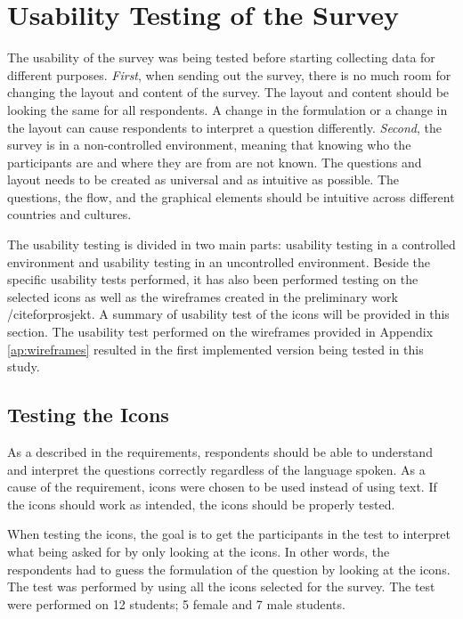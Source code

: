 \section{Usability Testing of the Survey}\label{sec:usabilitytestingsurvey}

  The usability of the survey was being tested before starting collecting data for different purposes. {\it First}, when sending out the survey, there is no much room for changing the layout and content of the survey. The layout and content should be looking the same for all respondents. A change in the formulation or a change in the layout can cause respondents to interpret a question differently. {\it Second}, the survey is in a non-controlled environment, meaning that knowing who the participants are and where they are from are not known. The questions and layout needs to be created as universal and as intuitive as possible. The questions, the flow, and the graphical elements should be intuitive across different countries and cultures. 

  The usability testing is divided in two main parts: usability testing in a controlled environment and usability testing in an uncontrolled environment. Beside the specific usability tests performed, it has also been performed testing on the selected icons as well as the wireframes created in the preliminary work /cite{forprosjekt}. A summary of usability test of the icons will be provided in this section. The usability test performed on the wireframes provided in Appendix \ref{ap:wireframes} resulted in the first implemented version being tested in this study. 

  \subsection{Testing the Icons}\label{sec:usabilityicontest}
  As a described in the requirements, respondents should be able to understand and interpret the questions correctly regardless of the language spoken. As a cause of the requirement, icons were chosen to be used instead of using text. If the icons should work as intended, the icons should be properly tested. 

  When testing the icons, the goal is to get the participants in the test to interpret what being asked for by only looking at the icons. In other words, the respondents had to guess the formulation of the question by looking at the icons. The test was performed by using all the icons selected for the survey. The test were performed on 12 students; 5 female and 7 male students.

